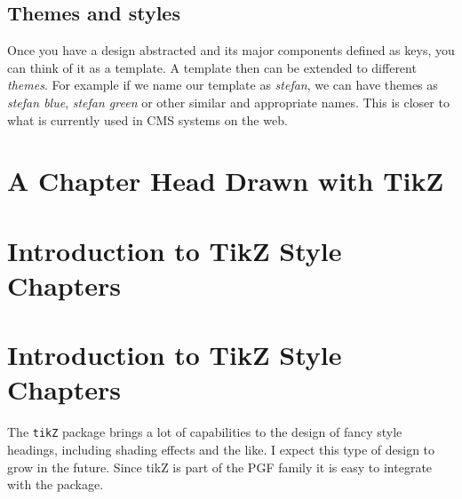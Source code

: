 \section{Themes and styles}

Once you have a design abstracted and its major components defined as keys, you can think of it as a template. A template then can be extended to different \textit{themes}. For example if we name our template as \textit{stefan}, we can have themes as \textit{stefan blue}, \textit{stefan green} or other similar and appropriate names. This is closer to what is currently used in CMS systems on the web.

\begin{tcblisting}{}
\end{tcblisting}


%
%
%



\pagestyle{chapterstyle}

\@specialtrue
\clearpage
{}
\chapter{A Chapter Head Drawn with TikZ}

\lipsum[1-3]

\clearpage




\chapter{Introduction to TikZ Style Chapters}
\chapter{Introduction to TikZ Style Chapters}
The \lstinline{tikZ} package brings a lot of capabilities to the design of fancy style headings, including shading effects and the like. I expect this type of design to grow in the future. Since tikZ is part of the PGF family it is easy to integrate with the package.

